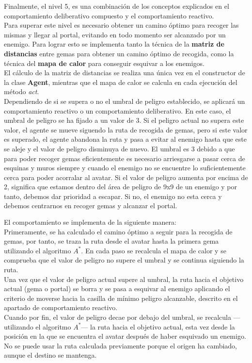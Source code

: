 Finalmente, el nivel 5, es una combinación de los conceptos explicados en el comportamiento deliberativo compuesto y el comportamiento reactivo.\\
Para superar este nivel es necesario obtener un camino óptimo para recoger las mismas y llegar al portal, evitando en todo momento ser alcanzado por un enemigo. Para lograr esto se implementa tanto la técnica de la \textbf{matriz de distancias} entre gemas para obtener un camino óptimo de recogida, como la técnica del \textbf{mapa de calor} para conseguir esquivar a los enemigos.\\
El cálculo de la matriz de distancias se realiza una única vez en el constructor de la clase \textbf{Agent}, mientras que el mapa de calor se calcula en cada ejecución del método \emph{act}.\\

Dependiendo de si se supera o no el umbral de peligro establecido, se aplicará un comportamiento reactivo o un comportamiento deliberativo. En este caso, el umbral de peligro se ha fijado a un valor de 3. Si el peligro actual no supera este valor, el agente se mueve siguendo la ruta de recogida de gemas, pero si este valor es superado, el agente abandona la ruta y pasa a evitar al enemigo hasta que este se aleje y el valor de peligro disminuya de nuevo. El umbral es 3 debido a que para poder recoger gemas eficientemente es necesario arriesgarse a pasar cerca de esquinas y muros siempre y cuando el enemigo no se encuentre lo suficientemente cerca para poder acorralar al avatar. Si el valor de peligro aumenta por encima de 2, significa que estamos dentro del área de peligro de 9x9 de un enemigo y por tanto, debemos dar prioridad a escapar. Si no, el enemigo no esta cerca y debemos centrarnos en recoger gemas y alcanzar el portal.

El comportamiento se implementa de la siguiente manera:\\
Primeramente, se ha calculado el camino óptimo a seguir para la recogida de gemas, por tanto, se traza la ruta desde el avatar hasta la primera gema utilizando el algoritmo $ A^{*} $. En cada paso se recalcula el mapa de calor y se comprueba que el valor de peligro no supere el umbral y se continua siguiendo la ruta.\\
Una vez que el valor de peligro actual supere al umbral, la ruta hacia el objetivo actual (gema o portal) se borra y se pasa a esquivar al enemigo aplicando el criterio de moverse hacia la casilla de mínimo peligro alcanzable, descrito en el apartado de comportamiento reactivo.\\
Cuando por fin, el valor de peligro decae por debajo del umbral, se recalcula ---utilizando el algoritmo $ A^{*} $--- la ruta hacia el objetivo actual, esta vez desde la posición en la que se encuentra el avatar después de haber esquivado un enemigo. No se puede usar la ruta calculada previamente porque el origen ha cambiado, aunque el destino se mantenga.\\

